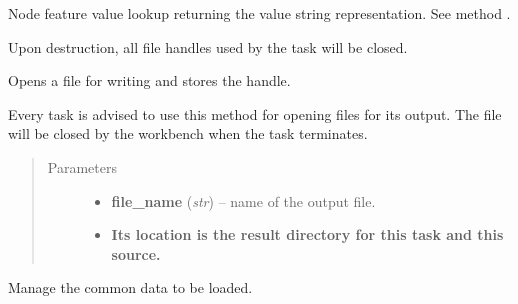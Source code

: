 \documentclass[letterpaper,10pt,english]{sphinxmanual}
\begin{document}
\begin{fulllineitems}
\begin{fulllineitems}
\end{fulllineitems}


\begin{fulllineitems}
\label{graf/graf:graf.task.GrafTask.FNr}
Node feature value lookup returning the value string representation.
See method {\hyperref[graf/graf:graf.task.GrafTask.FNi]{}}.

\end{fulllineitems}


\begin{fulllineitems}
\label{graf/graf:graf.task.GrafTask.__del__}
Upon destruction, all file handles used by the task will be closed.

\end{fulllineitems}


\begin{fulllineitems}
\label{graf/graf:graf.task.GrafTask.add_result}
Opens a file for writing and stores the handle.

Every task is advised to use this method for opening files for its output.
The file will be closed by the workbench when the task terminates.
\begin{quote}\begin{description}
\item[{Parameters}] \leavevmode\begin{itemize}
\item {} 
\textbf{file\_name} (\emph{str}) --
name of the output file.

\item {} 
\textbf{Its location is the result directory for this task and this source.}

\end{itemize}

\end{description}\end{quote}

\end{fulllineitems}


\begin{fulllineitems}
\label{graf/graf:graf.task.GrafTask.common_loader}
Manage the common data to be loaded.


\end{fulllineitems}
\end{fulllineitems}
\end{document}
